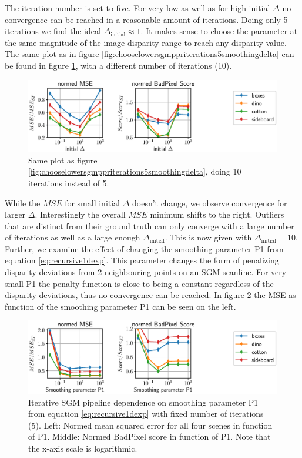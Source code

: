 \documentclass  [
  paper    = a4,
  BCOR     = 10mm,
  twoside,
  fontsize = 12pt,
  fleqn,
  toc      = bibnumbered,
  toc      = listofnumbered,
  numbers  = noendperiod,
  headings = normal,
  listof   = leveldown,
  version  = 3.03
]                                       {scrreprt}
\begin{document}
The iteration number is set to five. For very low as well as for high initial $\Delta$ no convergence can be reached in a reasonable amount of iterations. Doing only 5 iterations we find the ideal $\Delta_\text{initial} \approx 1$. It makes sense to choose the parameter at the same magnitude of the image disparity range to reach any disparity value.
The same plot as in figure \ref{fig:chooselowersgmppriterations5smoothingdelta} can be found in figure \ref{fig:chooselowersgmppriterations10smoothingdelta}, with a different number of iterations (10).
\begin{figure}[h!]
	\centering
	\includegraphics[width=1\linewidth]{images/choose_lower_sgm_ppr_iterations_10_smoothing_delta}
	\caption[Iterative SGM dependence on initial $\Delta$ with 10 iterations]{Same plot as figure \ref{fig:chooselowersgmppriterations5smoothingdelta}, doing 10 iterations instead of 5.}
	\label{fig:chooselowersgmppriterations10smoothingdelta}
\end{figure}
While the $MSE$ for small initial $\Delta$ doesn't change, we observe convergence for larger $\Delta$. Interestingly the overall $MSE$ minimum shifts to the right. Outliers that are distinct from their ground truth can only converge with a large number of iterations as well as a large enough $\Delta_\text{initial}$. This is now given with $\Delta_\text{initial} = 10$.
Further, we examine the effect of changing the smoothing parameter P1 from equation \ref{eq:recursive1dexp}. This parameter changes the form of penalizing disparity deviations from 2 neighbouring points on an SGM scanline. For very small P1 the penalty function is close to being a constant regardless of the disparity deviations, thus no convergence can be reached. In figure \ref{fig:chooselowersgmpprmergeiterationsexppenalty1} the MSE as function of the smoothing parameter P1 can be seen on the left.
\begin{figure}[h!]
	\centering
	\includegraphics[width=1\linewidth]{images/choose_lower_sgm_ppr_merge_iterations_exp_penalty1}
	\caption[Iterative SGM dependence on smoothing parameter]{Iterative SGM pipeline dependence on smoothing parameter P1 from equation \ref{eq:recursive1dexp} with fixed number of iterations (5). Left: Normed mean squared error for all four scenes in function of P1. Middle: Normed BadPixel score in function of P1. Note that the x-axis scale is logarithmic.}
	\label{fig:chooselowersgmpprmergeiterationsexppenalty1}
\end{figure}
\end{document}
